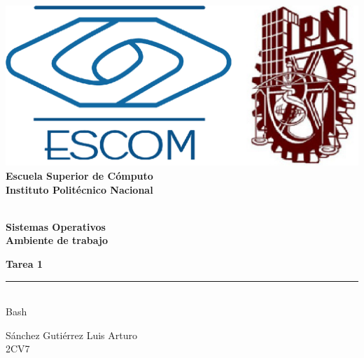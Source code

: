 
\begin{titlepage} %

    \begin{flushright}

	   \includegraphics[scale=0.15]{imagenes/escom-ipn.png}
	   \large \textbf{\\Escuela Superior de C\'omputo}
	   \large \textbf{\\Instituto Polit\'ecnico Nacional }%

	   \vspace{2.5cm} %

	   \large \textbf{\\Sistemas Operativos}%
	   \large \textbf{\\Ambiente de trabajo}%

	   \vspace{1.2cm} %

	   \large \textbf{Tarea 1}\\%
	   \rule{5cm}{3pt} %
	   \large{\\ Bash} %

	   \vspace{2.5cm} %

	   Sánchez Gutiérrez Luis Arturo \\ %
	   2CV7 %

	   \vspace{2.5cm} %

	   \date{\today}

    \end{flushright}

\end{titlepage}
